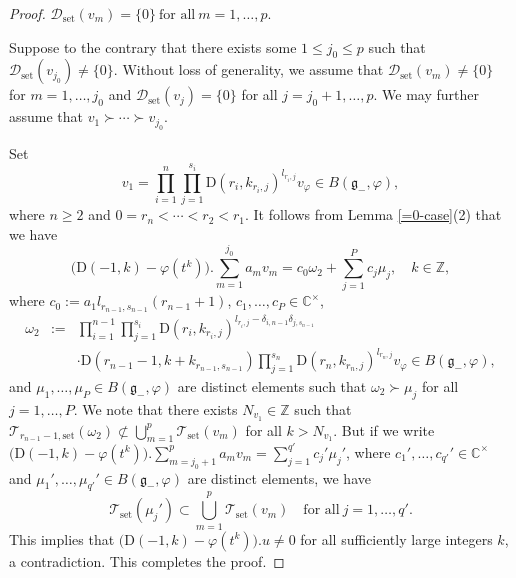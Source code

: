 \documentclass[12pt, a4paper]{amsart}
\newcommand{\fg}{\mathfrak g}
\newcommand{\C}{\mathbb{C}}
\newcommand{\Z}{\mathbb Z}
\newcommand{\rD}{\mathrm{D}}
\theoremstyle{Theorem}
\theoremstyle{Theorem}
\numberwithin{equation}{section}
\begin{document}
\begin{proof}
\vspace{3mm}

\qquad $\mathcal{D}_{\mathrm{set}}(v_{m})=\{0\}\ \text{for all}\ m=1,\dots,p$.

\noindent Suppose to the contrary that there exists some $1\leq j_{0}\leq p$ such that
$\mathcal{D}_{\mathrm{set}}(v_{j_{0}})\neq\{0\}$. Without loss of generality,
we assume that $\mathcal{D}_{\mathrm{set}}(v_{m})\neq\{0\}$ for $m=1,\dots,j_{0}$ and
$\mathcal{D}_{\mathrm{set}}(v_{j})=\{0\}$ for all $j=j_{0}+1,\dots,p$. We may further assume
that $v_{1}\succ\cdots\succ v_{j_{0}}$.

 Set
\[v_{1}=\prod_{i=1}^{n}\prod_{j=1}^{s_{i}}
\rD(r_{i},k_{r_{i},j})^{l_{r_{i},j}}v_{\varphi}\in B(\fg_{-},\varphi),\]
where $n\geq2$ and $0=r_{n}<\cdots<r_{2}<r_{1}$. It follows from Lemma \ref{=0-case}(2)
that we have
\[\big(\rD(-1,k)-\varphi(t^{k})\big).\sum_{m=1}^{j_{0}}a_{m}v_{m}=c_{0}\omega_{2}+\sum_{j=1}^{P}c_{j}\mu_{j},\quad k\in\Z,\]
where $c_{0}:=a_{1}l_{r_{n-1},s_{n-1}}(r_{n-1}+1)$, $c_{1},\dots,c_{P}\in\C^{\times}$,
\begin{eqnarray*}\omega_{2}&:=&\prod_{i=1}^{n-1}\prod_{j=1}^{s_{i}}
\rD(r_{i},k_{r_{i},j})^{l_{r_{i},j}-\delta_{i,n-1}\delta_{j,s_{n-1}}}\\ &&
\cdot \rD(r_{n-1}-1,k+k_{r_{n-1},s_{n-1}})\prod_{j=1}^{s_{n}}
\rD(r_{n},k_{r_{n},j})^{l_{r_{n},j}}v_{\varphi}\in B(\fg_{-},\varphi),\end{eqnarray*}
and $\mu_{1},\dots,\mu_{P}\in B(\fg_{-},\varphi)$ are distinct elements such that
$\omega_{2}\succ \mu_{j}$ for all $j=1,\dots,P$.
We note that there exists $N_{v_{1}}\in\Z$ such that
$\mathcal{T}_{r_{n-1}-1,\mathrm{set}}(\omega_{2})\not\subset\bigcup_{m=1}^{p}\mathcal{T}_{\mathrm{set}}(v_{m})$
for all $k>N_{v_{1}}$.
But if we write
$\big(\rD(-1,k)-\varphi(t^{k})\big).\sum_{m=j_{0}+1}^{p}a_{m}v_{m}=\sum_{j=1}^{q'}c_{j}'\mu_{j}'$,
where $c_{1}',\dots,c_{q'}'\in\C^{\times}$ and $\mu_{1}',\dots,\mu_{q'}'\in B(\fg_{-},\varphi)$ are distinct elements, we have
\[\mathcal{T}_{\mathrm{set}}(\mu_{j}')\subset\bigcup_{m=1}^{p}\mathcal{T}_{\mathrm{set}}(v_{m})\quad\text{for all}\ j=
1,\dots,q'.\]
This implies that
$\big(\rD(-1,k)-\varphi(t^{k})\big).u\neq0$ for all sufficiently large integers $k$,
a contradiction. This completes the proof.
\end{proof}
\end{document}
